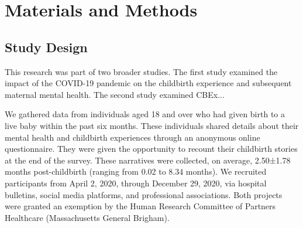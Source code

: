 \documentclass[bst/sn-nature]{sn-jnl}%
\theoremstyle{thmstyleone}%
\theoremstyle{thmstyletwo}%
\theoremstyle{thmstylethree}%
\begin{document}


\section{Materials and Methods}
\subsection{Study Design}
This research was part of two broader studies.
The first study examined the impact of the COVID-19 pandemic on the childbirth experience and subsequent maternal mental health.
The second study examined CBEx...

We gathered data from individuals aged 18 and over who had given birth to a live baby within the past six months.
These individuals shared details about their mental health and childbirth experiences through an anonymous online questionnaire.
They were given the opportunity to recount their childbirth stories at the end of the survey. 
These narratives were collected, on average, 2.50±1.78 months post-childbirth (ranging from 0.02 to 8.34 months). 
We recruited participants from April 2, 2020, through December 29, 2020, via hospital bulletins, social media platforms, and professional associations.
Both projects were granted an exemption by the Human Research Committee of Partners Healthcare (Massachusetts General Brigham).
\end{document}
